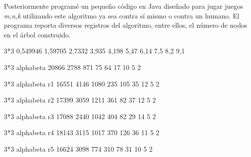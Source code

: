 Posteriormente programé un pequeño código en Java diseñado para jugar juegos \emph{m,n,k} utilizando este algoritmo ya sea contra sí mismo o contra un humano. El programa reporta diversos registros del algoritmo, entre ellos, el número de nodos en el árbol construido. 

3*3
0,549946
1,59705
2,7332
3,935
4,198
5,47
6,14
7,5
8,2
9,1

3*3 alphabeta
20866
2788
871
75
64
17
10
5
2

3*3 alphabeta r1
16551
4146
1080
235
105
35
12
5
2

3*3 alphabeta r2 
17399
3059
1211
361
82
37
12
5
2

3*3 alphabeta r3
17088
2440
1042
404
82
29
14
5
2

3*3 alphabeta r4 
18143
3115
1017
370
126
36
11
5
2

3*3 alphabeta r5
16624
3098
774
310
78
31
10
5
2
